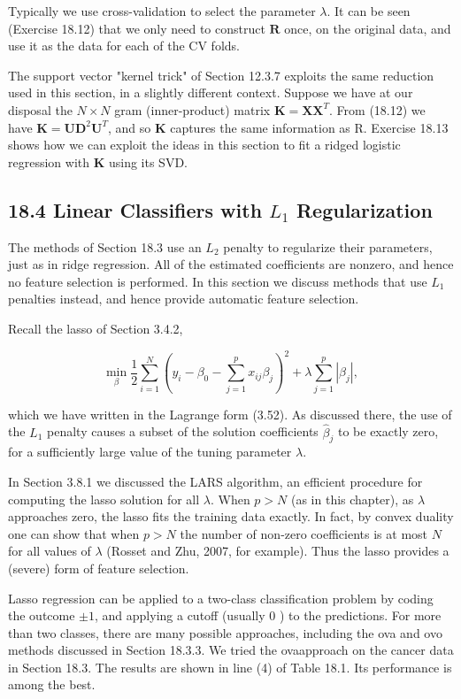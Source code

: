 \documentclass[10pt]{article}
\begin{document}
Typically we use cross-validation to select the parameter $\lambda$. It can be seen (Exercise 18.12) that we only need to construct $\mathbf{R}$ once, on the original data, and use it as the data for each of the CV folds.

The support vector "kernel trick" of Section 12.3.7 exploits the same reduction used in this section, in a slightly different context. Suppose we have at our disposal the $N \times N$ gram (inner-product) matrix $\mathbf{K}=\mathbf{X X}^{T}$. From (18.12) we have $\mathbf{K}=\mathbf{U D}^{2} \mathbf{U}^{T}$, and so $\mathbf{K}$ captures the same information as R. Exercise 18.13 shows how we can exploit the ideas in this section to fit a ridged logistic regression with $\mathbf{K}$ using its SVD.

\subsection*{18.4 Linear Classifiers with $L_{1}$ Regularization}
The methods of Section 18.3 use an $L_{2}$ penalty to regularize their parameters, just as in ridge regression. All of the estimated coefficients are nonzero, and hence no feature selection is performed. In this section we discuss methods that use $L_{1}$ penalties instead, and hence provide automatic feature selection.

Recall the lasso of Section 3.4.2,


\begin{equation*}
\min _{\beta} \frac{1}{2} \sum_{i=1}^{N}\left(y_{i}-\beta_{0}-\sum_{j=1}^{p} x_{i j} \beta_{j}\right)^{2}+\lambda \sum_{j=1}^{p}\left|\beta_{j}\right|, \tag{18.18}
\end{equation*}


which we have written in the Lagrange form (3.52). As discussed there, the use of the $L_{1}$ penalty causes a subset of the solution coefficients $\hat{\beta}_{j}$ to be exactly zero, for a sufficiently large value of the tuning parameter $\lambda$.

In Section 3.8.1 we discussed the LARS algorithm, an efficient procedure for computing the lasso solution for all $\lambda$. When $p>N$ (as in this chapter), as $\lambda$ approaches zero, the lasso fits the training data exactly. In fact, by convex duality one can show that when $p>N$ the number of non-zero coefficients is at most $N$ for all values of $\lambda$ (Rosset and Zhu, 2007, for example). Thus the lasso provides a (severe) form of feature selection.

Lasso regression can be applied to a two-class classification problem by coding the outcome $\pm 1$, and applying a cutoff (usually 0 ) to the predictions. For more than two classes, there are many possible approaches, including the ova and ovo methods discussed in Section 18.3.3. We tried the ovaapproach on the cancer data in Section 18.3. The results are shown in line (4) of Table 18.1. Its performance is among the best.
\end{document}
